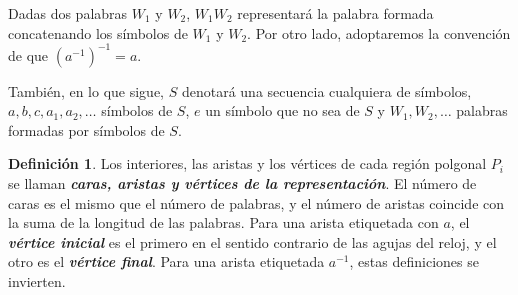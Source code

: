 \documentclass[10pt]{report}
\theoremstyle{definition}
\newtheorem{defin}{Definición}[section]
\begin{document}
Dadas dos palabras $W_1$ y $W_2$, $W_1W_2$ representará la palabra formada concatenando los símbolos de $W_1$ y $W_2$. Por otro lado, adoptaremos la convención de que $(a^{-1})^{-1}=a$.

También, en lo que sigue, $S$ denotará una secuencia cualquiera de símbolos, $a,b,c,a_1,a_2,\dots$ símbolos de $S$, $e$ un símbolo que no sea de $S$ y $W_1, W_2, \dots$ palabras formadas por símbolos de $S$.

\begin{defin}%
Los interiores, las aristas y los vértices de cada región polgonal $P_i$ se llaman \textbf{\emph{caras, aristas y vértices de la representación}}. El número de caras es el mismo que el número de palabras, y el número de aristas coincide con la suma de la longitud de las palabras.
Para una arista etiquetada con $a$, el \textbf{\emph{vértice inicial}} es el primero en el sentido contrario de las agujas del reloj, y el otro es el \textbf{\emph{vértice final}}. Para una arista etiquetada $a^{-1}$, estas definiciones se invierten. 
\end{defin}
\end{document}
